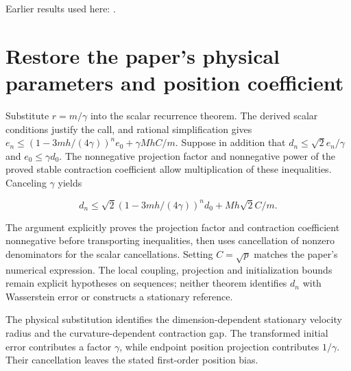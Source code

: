 \documentclass[11pt,a4paper]{article}
\begin{document}
Earlier results used here: \cite[Section~3.15.3]{LangevinLean2026ULASC}.

\section{\texorpdfstring{Restore the paper’s physical parameters and position coefficient}{Restore the paper’s physical parameters and position coefficient}}


Substitute \(r=m/\gamma\) into the scalar recurrence theorem. The derived scalar conditions justify the call, and rational simplification gives \(e_n\le(1-3mh/(4\gamma))^ne_0+\gamma MhC/m\). Suppose in addition that \(d_n\le\sqrt2e_n/\gamma\) and \(e_0\le\gamma d_0\). The nonnegative projection factor and nonnegative power of the proved stable contraction coefficient allow multiplication of these inequalities. Canceling \(\gamma\) yields

\[d_n\le\sqrt2(1-3mh/(4\gamma))^nd_0+Mh\sqrt2C/m.\]

The argument explicitly proves the projection factor and contraction coefficient nonnegative before transporting inequalities, then uses cancellation of nonzero denominators for the scalar cancellations. Setting \(C=\sqrt p\) matches the paper’s numerical expression. The local coupling, projection and initialization bounds remain explicit hypotheses on sequences; neither theorem identifies \(d_n\) with Wasserstein error or constructs a stationary reference.



The physical substitution identifies the dimension-dependent stationary velocity radius and the curvature-dependent contraction gap. The transformed initial error contributes a factor \(\gamma\), while endpoint position projection contributes \(1/\gamma\). Their cancellation leaves the stated first-order position bias.
\end{document}
